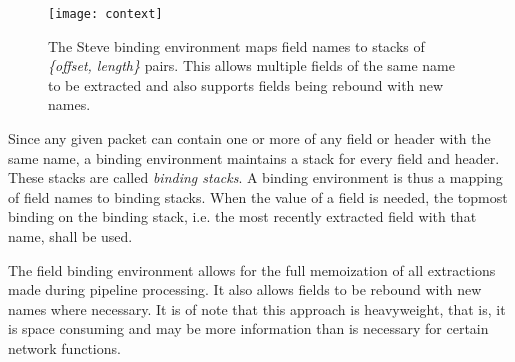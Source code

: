 \begin{figure}[ht]
\centering
\texttt{[image: context]}
\caption{The Steve binding environment maps field names to stacks of
\emph{\{offset, length\}} pairs. This allows multiple fields of the same
name to be extracted and also supports fields being rebound with new names.}
\label{fg:ContextEnv} 
\end{figure}

Since any given packet can contain one or more of any field or header with the
same name, a binding environment maintains a stack for every field and header.
These stacks are called \emph{binding stacks}. A binding environment is thus a 
mapping of field names to binding stacks. 
When the value of a field is needed, 
the topmost binding on the binding stack, i.e. the
most recently extracted field with that name, shall be used.

The field binding environment allows for the full memoization of all
extractions made during pipeline processing. It also allows fields to
be rebound with new names where necessary. It is of note that this
approach is heavyweight, that is, it is space consuming and may be
more information than is necessary for certain network functions.

